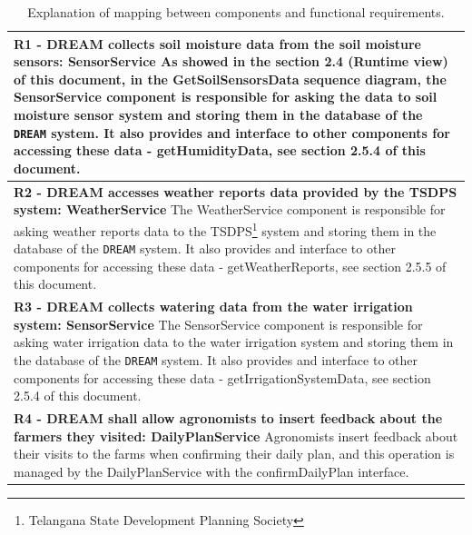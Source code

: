 \documentclass{article}
\begin{document}
\begin{longtable}[c]{|m{11.75cm}|}
\caption{Explanation of mapping between components and functional requirements.}
 \label{comp-req mapping explanation}
    \hline
    \textbf{R1 - DREAM collects soil moisture data from the soil moisture sensors: SensorService}
    \newline\newline
    As showed in the section 2.4 (Runtime view) of this document, in the GetSoilSensorsData sequence diagram, the SensorService component is responsible for asking the data to soil moisture sensor system and storing them in the database of the \verb|DREAM| system. It also provides and interface to other components for accessing these data - getHumidityData, see section 2.5.4 of this document.\\ 
    \hline
    
    \textbf{R2 - DREAM accesses weather reports data provided by the TSDPS system: WeatherService}
    \newline\newline
    The WeatherService component is responsible for asking weather reports data to the TSDPS\footnote{Telangana State Development Planning Society} system and storing them in the database of the \verb|DREAM| system. It also provides and interface to other components for accessing these data - getWeatherReports, see section 2.5.5 of this document.\\ 
    \hline
    
    \textbf{R3 - DREAM collects watering data from the water irrigation system: SensorService}
    \newline\newline
    The SensorService component is responsible for asking water irrigation data to the water irrigation system and storing them in the database of the \verb|DREAM| system. It also provides and interface to other components for accessing these data - getIrrigationSystemData, see section 2.5.4 of this document.\\ 
    \hline
    
    \textbf{R4 - DREAM shall allow agronomists to insert feedback about the farmers they
    visited: DailyPlanService}
    \newline\newline
    Agronomists insert feedback about their visits to the farms when confirming their daily plan, and this operation is managed by the DailyPlanService with the confirmDailyPlan interface.
    \hline
    

\end{longtable}
\end{document}

